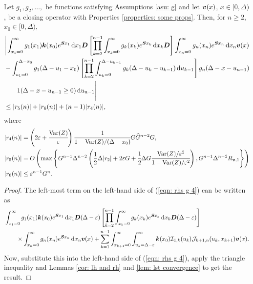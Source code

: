 \begin{cor}\label{cor: a cor}
        Let \(g_1,g_2,\dots,\) be functions satisfying Assumptions \ref{asu: g} and let \({\boldsymbol v}(x)\), \(x\in[0,\Delta)\), be a closing operator with Properties \ref{properties: some props}. Then, for \(n\geq 2\), \(x_0\in[0,\Delta)\), 
	\begin{align}
		&\Bigg| \int_{x_1=0}^\infty g_1(x_1) \boldsymbol k(x_0) e^{\boldsymbol{S}x_1}\, \mathrm{d} x_1\boldsymbol D 
            	\left[\prod_{k=2}^{n-1}\int_{x_k=0}^\infty g_k(x_k) e^{\boldsymbol{S}x_k} \, \mathrm{d} x_k \boldsymbol D\right] \int_{x_n=0}^\infty g_{n}(x_n) e^{\boldsymbol{S}x_n} \, \mathrm{d} x_n {\boldsymbol v}(x) \nonumber 
		\\&{}- \int_{u_1=0}^{\Delta-x_0}g_1(\Delta - u_1 - x_0)
		\left[\prod_{k=2}^{n-1} \int_{u_k=0}^{\Delta-u_{k-1}} g_k(\Delta-u_k-u_{k-1})\, \mathrm{d} u_{k-1}\right] \nonumber 
            	g_{n}(\Delta - x-u_{n-1})
	\\&\qquad{} 1(\Delta-x-u_{n-1}\geq0) \, \mathrm{d} u_{n-1} \Bigg| \nonumber
		\\&\leq |r_5(n)| + |r_6(n)| + (n-1)|r_4(n)|, \label{eqn: rhs g 4}
	\end{align}
	where 
	\begin{align*}
		|r_4(n)| &= \left(2\varepsilon + \cfrac{\mathrm{Var}(Z)}{\varepsilon}\right) \cfrac{1}{1-\mathrm{Var}(Z)/(\Delta-x_0)} G \widehat G^{n-2} G ,
		\\|r_5(n)|&= O\left(\max\left\{G^{n-1}\Delta^{n-2}\left(\frac{1}{2}\Delta|r_2 |+ 2\varepsilon G 
		+ \cfrac{1}{2}\Delta G\cfrac{\mathrm{Var}(Z)/\varepsilon^2}{1-\mathrm{Var}(Z)/\varepsilon^2}\right),
		G^{n-1}\Delta^{n-2}R_{{\boldsymbol v},1}\right\}\right)
		\\|r_6(n)| &\leq\varepsilon^{n-1}G^n.
	\end{align*}
\end{cor}
\begin{proof}
	The left-most term on the left-hand side of (\ref{eqn: rhs g 4}) can be written as 
	\begin{align}
		&\int_{x_1=0}^\infty g_1(x_1) \boldsymbol k(x_0)e^{\boldsymbol{S}x_1}\, \mathrm{d} x_1\boldsymbol D(\Delta-\varepsilon)
            	\left[\prod_{k=2}^{n-1}\int_{x_k=0}^\infty g_k(x_k) e^{\boldsymbol{S}x_k} \, \mathrm{d} x_k \boldsymbol D(\Delta-\varepsilon)\right]
            	\\&\qquad \times\int_{x_n=0}^\infty g_{n}(x_n) e^{\boldsymbol{S}x_n} \, \mathrm{d} x_n {\boldsymbol v}(x) \nonumber 
	+\sum_{k=1}^{n-1} \int_{x_{k+1}=0}^\infty \int_{u_k=\Delta-\varepsilon}^\infty \boldsymbol k(x_0)\mathcal I_{1,k}(u_k) \mathcal J_{k+1,n}(u_k,x_{k+1}){\boldsymbol v}(x). \nonumber
	\end{align}
	 Now, substitute this into the left-hand side of (\ref{eqn: rhs g 4}), apply the triangle inequality and Lemmas \ref{cor: lh and rh} and \ref{lem: lst convergence} to get the result.  
\end{proof}

